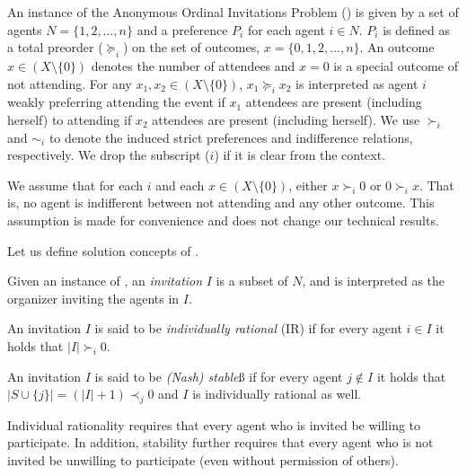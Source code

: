 \begin{definition}
An instance of the Anonymous Ordinal Invitations Problem (\AOIP) is given by a set of agents $N = \{1, 2, \dots, n\}$ and a preference $P_i$ for each agent $i\in N$. $P_i$ is defined as a total preorder ($\succeq_i$) on the set of outcomes, $x = \{0, 1, 2, \dots, n\}$. An outcome $x\in (X\setminus\{0\})$ denotes the number of attendees and $x = 0$ is a special outcome of not attending. 
For any $x_1, x_2\in (X \setminus\{0\})$, $x_1 \succeq_i x_2$ is interpreted as agent $i$ weakly preferring attending the event if $x_1$ attendees are present (including herself) to attending if $x_2$ attendees are present (including herself).
We use $\succ_i$ and $\sim_i$ to denote the induced strict preferences and indifference relations, respectively. 
We drop the subscript ($i$) if it is clear from the context.
\end{definition}

We assume that for each $i$ and each $x\in (X\setminus\{0\})$, either $x \succ_i 0$ or $0 \succ_i x$. That is, no agent is indifferent between not attending and any other outcome. This assumption is made for convenience and does not change our technical results.

Let us define solution concepts of \AOIP.

\begin{definition} \label{GT:def:invitation}
Given an instance of \AOIP, an \emph{invitation} $I$ is a subset of $N$, and is interpreted as the organizer inviting the agents in $I$. 

An invitation $I$ is said to be \emph{individually rational} (IR) if for every agent $i\in I$ it holds that $|I| \succ_i 0$. 

An invitation $I$ is said to be \emph{(Nash) stable}ß if for every agent $j\not\in I$ it holds that $|S \cup \{j\}| = (|I| + 1) \prec_j 0$ and $I$ is individually rational as well.
\end{definition}
Individual rationality requires that every agent who is invited be willing to participate. In addition, stability further requires that every agent who is not invited be unwilling to participate (even without permission of others).


